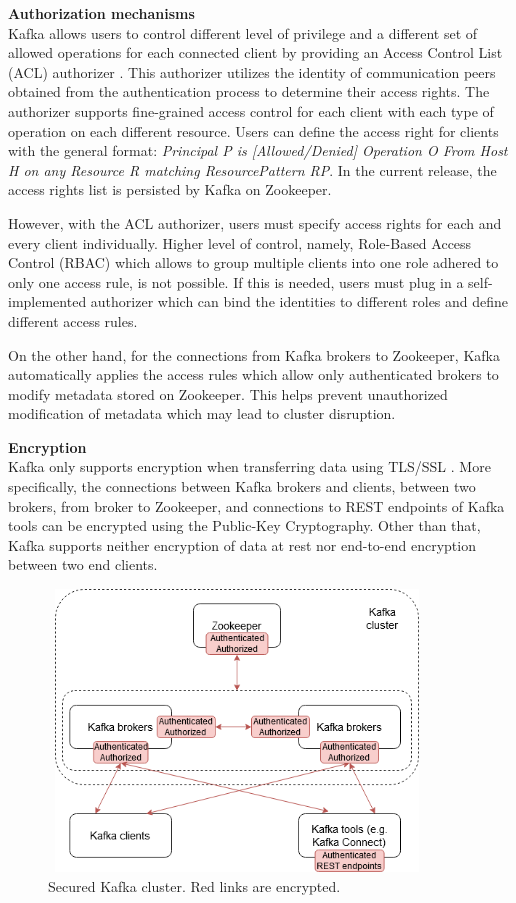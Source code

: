 \textbf{Authorization mechanisms}\\
Kafka allows users to control different level of privilege and a different set of allowed operations for each connected client by providing an Access Control List (ACL) authorizer \cite{kafkasecurity}. This authorizer utilizes the identity of communication peers obtained from the authentication process to determine their access rights. The authorizer supports fine-grained access control for each client with each type of operation on each different resource. Users can define the access right for clients with the general format: \emph{Principal P is [Allowed/Denied] Operation O From Host H on any Resource R matching ResourcePattern RP}. In the current release, the access rights list is persisted by Kafka on Zookeeper. 

However, with the ACL authorizer, users must specify access rights for each and every client individually. Higher level of control, namely, Role-Based Access Control (RBAC) which allows to group multiple clients into one role adhered to only one access rule, is not possible. If this is needed, users must plug in a self-implemented authorizer which can bind the identities to different roles and define different access rules. 

On the other hand, for the connections from Kafka brokers to Zookeeper, Kafka automatically applies the access rules which allow only authenticated brokers to modify metadata stored on Zookeeper. This helps prevent unauthorized modification of metadata which may lead to cluster disruption.

\textbf{Encryption}\\
Kafka only supports encryption when transferring data using TLS/SSL \cite{kafkasecurity}. More specifically, the connections between Kafka brokers and clients, between two brokers, from broker to Zookeeper, and connections to REST endpoints of Kafka tools can be encrypted using the Public-Key Cryptography. Other than that, Kafka supports neither encryption of data at rest nor end-to-end encryption between two end clients.  

\begin{figure}[h]
	\centering
	\includegraphics[width=10cm,height=7.5cm]{images/security-kafka.png}
	\caption{Secured Kafka cluster. Red links are encrypted.}
	\label{fig:securitykafka}
\end{figure}

